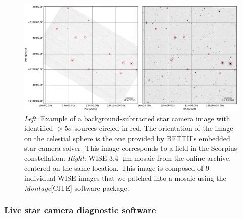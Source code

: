 \begin{landscape}
\begin{figure}[!ht]
	\centering
	\includegraphics[width=1.5\textwidth]{Figures/starcam_images.pdf}
	\caption[Star camera example WISE]{\textit{Left}: Example of a background-subtracted star camera image with identified $>5\sigma$ sources circled in red. The orientation of the image on the celestial sphere is the one provided by BETTII's embedded star camera solver. This image corresponds to a field in the Scorpius constellation. \textit{Right}: WISE \SI{3.4}{\um} mosaic from the online archive, centered on the same location. This image is composed of 9 individual WISE images that we patched into a mosaic using the \textit{Montage}[CITE] software package.}
	\label{fig:starcamexample}
    \end{figure}
\end{landscape}

\subsubsection{Live star camera diagnostic software}

